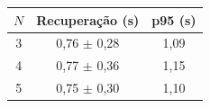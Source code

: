 \begin{tabular}{ccc}
\toprule
$N$ & Recuperação (s) & p95 (s) \\
\midrule
3 & 0,76 $\pm$ 0,28 & 1,09 \\
4 & 0,77 $\pm$ 0,36 & 1,15 \\
5 & 0,75 $\pm$ 0,30 & 1,10 \\
\bottomrule
\end{tabular}
